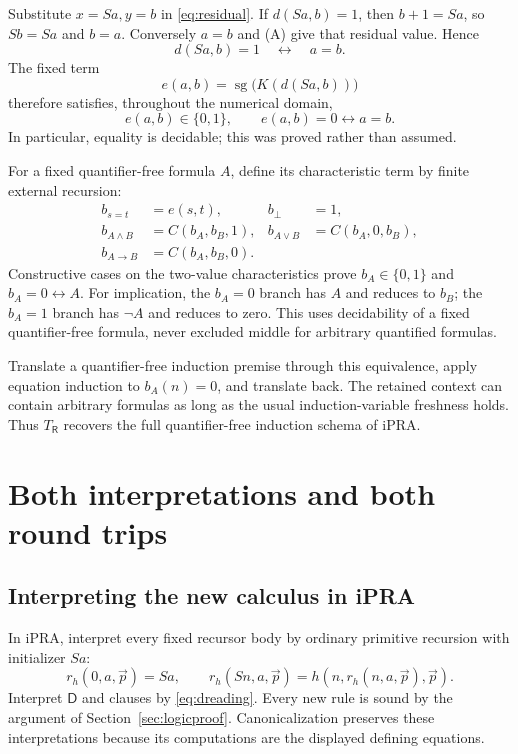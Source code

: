 \documentclass[11pt]{article}
\theoremstyle{definition}
\theoremstyle{remark}
\newcommand{\R}{\mathsf R}
\newcommand{\D}{\mathsf D}
\begin{document}
Substitute $x=Sa,y=b$ in \eqref{eq:residual}.
If $d(Sa,b)=1$, then $b+1=Sa$, so
$Sb=Sa$ and $b=a$. Conversely $a=b$
and (A) give that residual value. Hence
\[
 d(Sa,b)=1\quad\leftrightarrow\quad a=b.
\]
The fixed term
\[
 e(a,b)=\operatorname{sg}\bigl(K(d(Sa,b))\bigr)
\]
therefore satisfies, throughout the numerical
domain,
\[
 e(a,b)\in\{0,1\},\qquad e(a,b)=0\leftrightarrow a=b.
 \tag{Equality reflection}
\]
In particular, equality is decidable; this
was proved rather than assumed.

For a fixed quantifier-free formula $A$, define
its characteristic term by finite external
recursion:
\begin{align*}
 b_{s=t}&=e(s,t),&b_\bot&=1,\\
 b_{A\land B}&=C(b_A,b_B,1),&
 b_{A\lor B}&=C(b_A,0,b_B),\\
 b_{A\to B}&=C(b_A,b_B,0).
\end{align*}
Constructive cases on the two-value
characteristics prove
$b_A\in\{0,1\}$ and $b_A=0\leftrightarrow A$.
For implication, the $b_A=0$ branch has $A$
and reduces to $b_B$; the $b_A=1$ branch
has $\neg A$ and reduces to zero.
This uses decidability of a fixed
quantifier-free formula, never excluded
middle for arbitrary quantified formulas.

Translate a quantifier-free induction
premise through this equivalence, apply
equation induction to $b_A(n)=0$, and
translate back. The retained context can
contain arbitrary formulas as long as the
usual induction-variable freshness holds.
Thus $T_{\R}$ recovers the full
quantifier-free induction schema of iPRA.

\section{Both interpretations and both round trips}
\label{sec:biinterp}

\subsection{Interpreting the new calculus in iPRA}

In iPRA, interpret every fixed recursor body by
ordinary primitive recursion with initializer
$Sa$:
\[
 r_h(0,a,\vec p)=Sa,\qquad
 r_h(Sn,a,\vec p)=h(n,r_h(n,a,\vec p),\vec p).
\]
Interpret $\D$ and clauses by
\eqref{eq:dreading}. Every new rule is sound
by the argument of Section~\ref{sec:logicproof}.
Canonicalization preserves these interpretations
because its computations are the displayed
defining equations.
\end{document}
